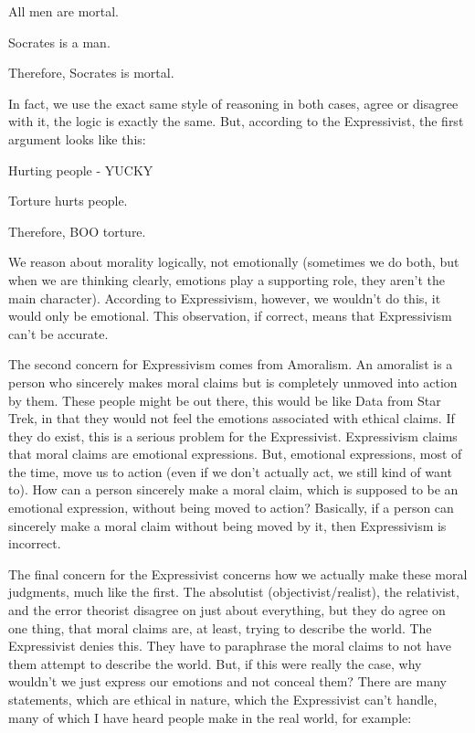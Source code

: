 \begin{earg}
    \item[]All men are mortal.
    \item[]Socrates is a man.
    \item[]Therefore, Socrates is mortal.
\end{earg}

In fact, we use the exact same style of reasoning in both cases, agree or disagree with it, the logic is exactly the same. But, according to the Expressivist, the first argument looks like this:
\begin{earg}
    \item[]Hurting people - YUCKY
    \item[]Torture hurts people.
    \item[]Therefore, BOO torture. 
\end{earg}
We reason about morality logically, not emotionally (sometimes we do both, but when we are thinking clearly, emotions play a supporting role, they aren't the main character). According to Expressivism, however, we wouldn't do this, it would only be emotional. This observation, if correct, means that Expressivism can't be accurate. 

The second concern for Expressivism comes from Amoralism. An amoralist is a person who sincerely makes moral claims but is completely unmoved into action by them. These people might be out there, this would be like Data from Star Trek, in that they would not feel the emotions associated with ethical claims. If they do exist, this is a serious problem for the Expressivist. Expressivism claims that moral claims are emotional expressions. But, emotional expressions, most of the time, move us to action (even if we don’t actually act, we still kind of want to). How can a person sincerely make a moral claim, which is supposed to be an emotional expression, without being moved to action?  Basically, if a person can sincerely make a moral claim without being moved by it, then Expressivism is incorrect. 

The final concern for the Expressivist concerns how we actually make these moral judgments, much like the first. The absolutist (objectivist/realist), the relativist, and the error theorist disagree on just about everything, but they do agree on one thing, that moral claims are, at least, trying to describe the world. The Expressivist denies this. They have to paraphrase the moral claims to not have them attempt to describe the world. But, if this were really the case, why wouldn’t we just express our emotions and not conceal them? There are many statements, which are ethical in nature, which the Expressivist can't handle, many of which I have heard people make in the real world, for example:

